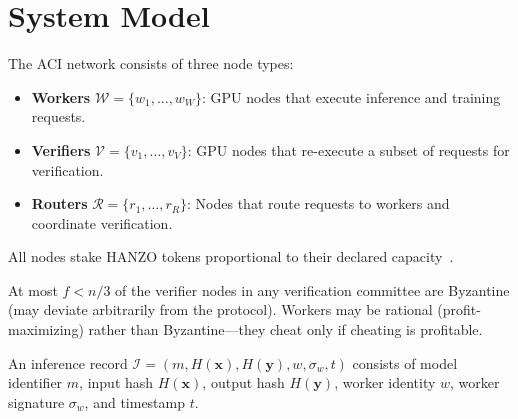 \section{System Model}

\label{sec:model}

\begin{definition}
The ACI network consists of three node types:
\begin{itemize}[leftmargin=1.1em]
    \item \textbf{Workers} $\mathcal{W} = \{w_1, \ldots, w_W\}$: GPU nodes
    that execute inference and training requests.
    \item \textbf{Verifiers} $\mathcal{V} = \{v_1, \ldots, v_V\}$: GPU nodes
    that re-execute a subset of requests for verification.
    \item \textbf{Routers} $\mathcal{R} = \{r_1, \ldots, r_R\}$: Nodes that
    route requests to workers and coordinate verification.
\end{itemize}
All nodes stake HANZO tokens proportional to their declared
capacity~\cite{hanzotokenomics}.
\end{definition}

\begin{assumption}
At most $f < n/3$ of the verifier nodes in any verification committee are
Byzantine (may deviate arbitrarily from the protocol). Workers may be rational
(profit-maximizing) rather than Byzantine---they cheat only if cheating is
profitable.
\end{assumption}

\begin{definition}
An inference record $\mathcal{I} = (m, H(\mathbf{x}), H(\mathbf{y}), w, \sigma_w, t)$
consists of model identifier $m$, input hash $H(\mathbf{x})$, output hash
$H(\mathbf{y})$, worker identity $w$, worker signature $\sigma_w$, and
timestamp $t$.
\end{definition}

